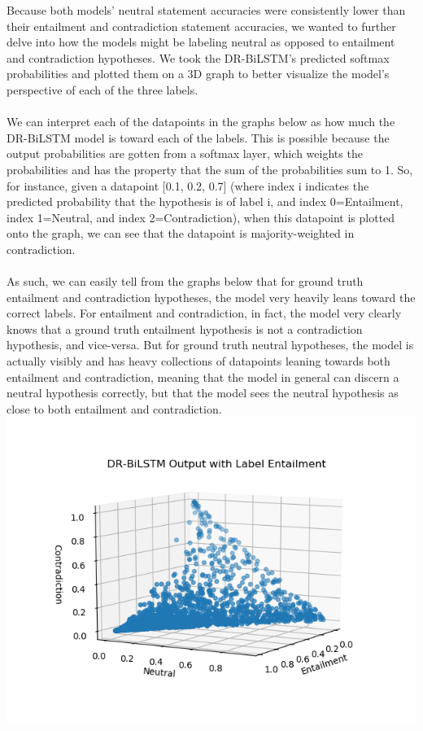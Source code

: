 \documentclass[12pt,letterpaper]{article}
\begin{document}
Because both models' neutral statement accuracies were consistently lower than their entailment and contradiction statement accuracies, we wanted to further delve into how the models might be labeling neutral as opposed to entailment and contradiction hypotheses. We took the DR-BiLSTM's predicted softmax probabilities and plotted them on a 3D graph to better visualize the model's perspective of each of the three labels.\\ \\
We can interpret each of the datapoints in the graphs below as how much the DR-BiLSTM model is  toward each of the labels. This is possible because the output probabilities are gotten from a softmax layer, which weights the probabilities and has the property that the sum of the probabilities sum to 1. So, for instance, given a datapoint [0.1, 0.2, 0.7] (where index i indicates the predicted probability that the hypothesis is of label i, and index 0=Entailment, index 1=Neutral, and index 2=Contradiction), when this datapoint is plotted onto the graph, we can see that the datapoint is majority-weighted in contradiction. \\ \\ 
As such, we can easily tell from the graphs below that for ground truth entailment and contradiction hypotheses, the model very heavily leans toward the correct labels. For entailment and contradiction, in fact, the model very clearly knows that a ground truth entailment hypothesis is not a contradiction hypothesis, and vice-versa. But for ground truth neutral hypotheses, the model is actually visibly  and has heavy collections of datapoints leaning towards both entailment and contradiction, meaning that the model in general can discern a neutral hypothesis correctly, but that the model sees the neutral hypothesis as close to both entailment and contradiction.\\
\includegraphics[scale=0.55]{lstmEntailment.png}
\end{document}
